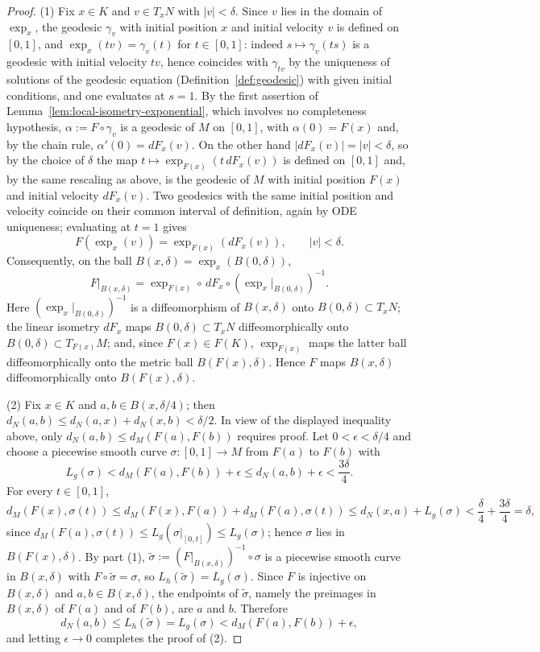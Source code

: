\begin{proof}
(1) Fix $x\in K$ and $v\in T_xN$ with $|v|<\delta$. Since $v$ lies
in the domain of $\exp_x$, the geodesic $\gamma_v$ with initial
position $x$ and initial velocity $v$ is defined on $[0,1]$, and
$\exp_x(tv)=\gamma_v(t)$ for $t\in[0,1]$: indeed
$s\mapsto\gamma_v(ts)$ is a geodesic with initial velocity $tv$,
hence coincides with $\gamma_{tv}$ by the uniqueness of solutions
of the geodesic equation (Definition~\ref{def:geodesic}) with
given initial conditions, and one evaluates at $s=1$. By the first
assertion of Lemma~\ref{lem:local-isometry-exponential}, which
involves no completeness hypothesis, $\alpha:=F\circ\gamma_v$ is a
geodesic of $M$ on $[0,1]$, with $\alpha(0)=F(x)$ and, by the
chain rule, $\alpha'(0)=dF_x(v)$. On the other hand
$|dF_x(v)|=|v|<\delta$, so by the choice of $\delta$ the map
$t\mapsto\exp_{F(x)}\left(t\,dF_x(v)\right)$ is defined on $[0,1]$
and, by the same rescaling as above, is the geodesic of $M$ with
initial position $F(x)$ and initial velocity $dF_x(v)$. Two
geodesics with the same initial position and velocity coincide on
their common interval of definition, again by ODE uniqueness;
evaluating at $t=1$ gives
$$F\left(\exp_x(v)\right)=\exp_{F(x)}\left(dF_x(v)\right),
\qquad|v|<\delta.$$
Consequently, on the ball
$B(x,\delta)=\exp_x\left(B(0,\delta)\right)$,
$$F|_{B(x,\delta)}=\exp_{F(x)}\circ\,dF_x\circ
\left(\exp_x|_{B(0,\delta)}\right)^{-1}.$$
Here $\left(\exp_x|_{B(0,\delta)}\right)^{-1}$ is a diffeomorphism
of $B(x,\delta)$ onto $B(0,\delta)\subset T_xN$; the linear
isometry $dF_x$ maps $B(0,\delta)\subset T_xN$ diffeomorphically
onto $B(0,\delta)\subset T_{F(x)}M$; and, since $F(x)\in F(K)$,
$\exp_{F(x)}$ maps the latter ball diffeomorphically onto the
metric ball $B(F(x),\delta)$. Hence $F$ maps $B(x,\delta)$
diffeomorphically onto $B(F(x),\delta)$.

(2) Fix $x\in K$ and $a,b\in B(x,\delta/4)$; then $d_N(a,b)\le
d_N(a,x)+d_N(x,b)<\delta/2$. In view of the displayed inequality
above, only $d_N(a,b)\le d_M(F(a),F(b))$ requires proof. Let
$0<\epsilon<\delta/4$ and choose a piecewise smooth curve
$\sigma\colon[0,1]\to M$ from $F(a)$ to $F(b)$ with
$$L_g(\sigma)<d_M\left(F(a),F(b)\right)+\epsilon\le
d_N(a,b)+\epsilon<\frac{3\delta}{4}.$$
For every $t\in[0,1]$,
$$d_M\left(F(x),\sigma(t)\right)\le
d_M\left(F(x),F(a)\right)+d_M\left(F(a),\sigma(t)\right)\le
d_N(x,a)+L_g(\sigma)<\frac{\delta}{4}+\frac{3\delta}{4}=\delta,$$
since $d_M(F(a),\sigma(t))\le L_g(\sigma|_{[0,t]})\le
L_g(\sigma)$; hence $\sigma$ lies in $B(F(x),\delta)$. By part
(1), $\tilde\sigma:=\left(F|_{B(x,\delta)}\right)^{-1}\circ\sigma$
is a piecewise smooth curve in $B(x,\delta)$ with
$F\circ\tilde\sigma=\sigma$, so $L_h(\tilde\sigma)=L_g(\sigma)$.
Since $F$ is injective on $B(x,\delta)$ and $a,b\in B(x,\delta)$,
the endpoints of $\tilde\sigma$, namely the preimages in
$B(x,\delta)$ of $F(a)$ and of $F(b)$, are $a$ and $b$. Therefore
$$d_N(a,b)\le L_h(\tilde\sigma)=L_g(\sigma)
<d_M\left(F(a),F(b)\right)+\epsilon,$$
and letting $\epsilon\to0$ completes the proof of (2).


\end{proof}

